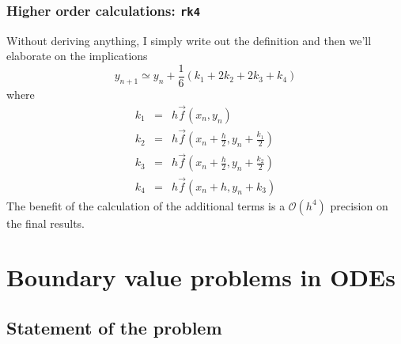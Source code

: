\documentclass[hyperref={colorlinks=true}]{beamer}
\begin{document}

\begin{frame}%
  \frametitle{Higher order calculations: \texttt{rk4}}

  Without deriving anything, I simply write out the definition and then we'll elaborate on the implications
  \begin{equation}
    y_{n+1} \simeq y_n + \frac{1}{6}\left( k_1 + 2k_2 + 2k_3 + k_4 \right) 
  \end{equation}
  where
  \begin{eqnarray}
    k_1 &=& h\vec{f}(x_n, y_n)\\
    k_2 &=& h\vec{f}\left( x_n + \frac{h}{2}, y_n + \frac{k_1}{2} \right)\\
    k_3 &=& h\vec{f}\left( x_n + \frac{h}{2}, y_n + \frac{k_2}{2} \right)\\
    k_4 &=& h\vec{f}\left( x_n + h          , y_n + k_3           \right)    
  \end{eqnarray}
  The benefit of the calculation of the additional terms is a $\mathcal{O}(h^4)$ precision on the final results.
  
\end{frame}

\section[Boundary value problems in ODEs]{Boundary value problems in ODEs}

\subsection[Statement of the problem]{Statement of the problem}
\end{document}

